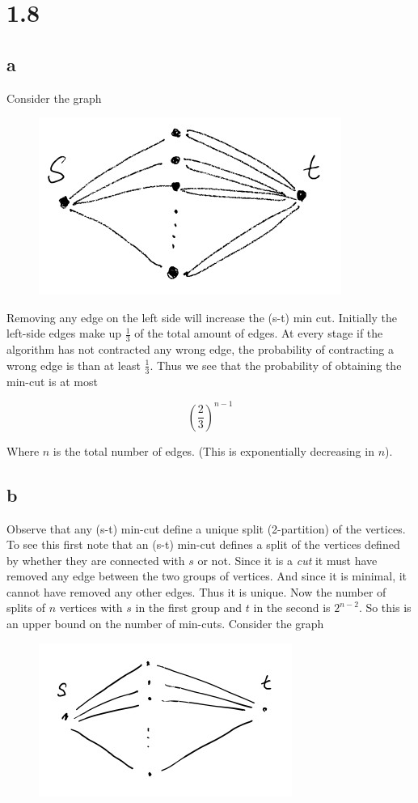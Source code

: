\documentclass{article}
\begin{document}
\section*{1.8}

\subsection*{a}

Consider the graph

\begin{figure}[h]
	\centering
	\includegraphics[width=0.4\linewidth]{graph1.jpg}

\end{figure}

Removing any edge on the left side will increase the (s-t) min cut. 
Initially the left-side edges make up $\frac{1}{3}$ of the total amount of edges.
At every stage if the algorithm has not contracted any wrong edge, the probability of contracting a wrong edge is than at least $\frac{1}{3}$. Thus we see that the probability of obtaining the min-cut is at most

$$ \left(\frac{2}{3}\right)^{n-1} $$

Where $n$ is the total number of edges. (This is exponentially decreasing in $n$).

\subsection*{b}

Observe that any (s-t) min-cut define a unique split (2-partition) of the vertices.
To see this first note that an (s-t) min-cut defines a split of the vertices defined by whether they are connected with $s$ or not. 
Since it is a \emph{cut} it must have removed any edge between the two groups of vertices.
And since it is minimal, it cannot have removed any other edges. 
Thus it is unique.
Now the number of splits of $n$ vertices with $s$ in the first group and $t$ in the second is $2^{n-2}$.
So this is an upper bound on the number of min-cuts.
Consider the graph

\begin{figure}[h]
	\centering
	\includegraphics[width=0.4\linewidth]{graph2.jpg}
\end{figure}
\end{document}
